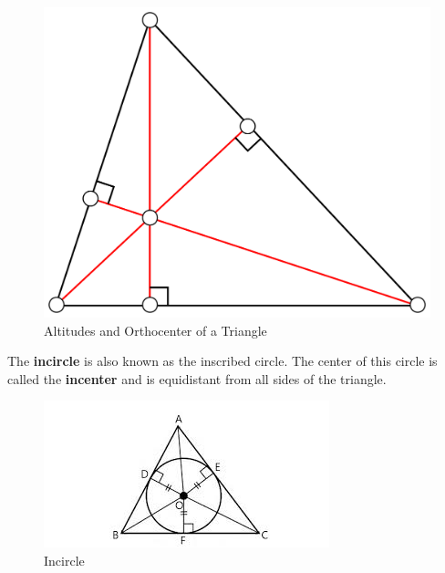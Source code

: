         \begin{figure} [hbt!]
            \centering
            \includegraphics[scale = 0.08] {Resources/Unit2Triangles/orthocenter.PNG}
            \caption*{Altitudes and Orthocenter of a Triangle}
        \end{figure}

        \noindent The \textbf{incircle} is also known as the inscribed circle. The center of
        this circle is called the \textbf{incenter} and is equidistant from all sides of the
        triangle. \\

        \begin{figure} [hbt!]
            \centering
            \includegraphics[scale = 0.75] {Resources/Unit2Triangles/incircle.jpg}
            \caption*{Incircle}
        \end{figure}

